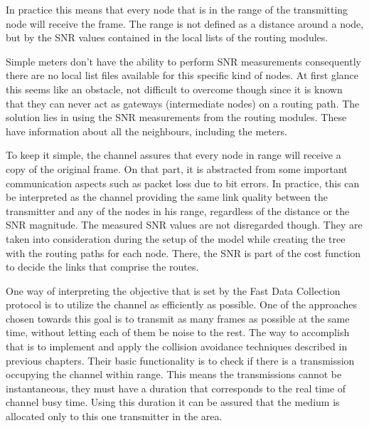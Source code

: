 In practice this means that every node that is in the range of the transmitting node will receive the frame. The range is not defined as a distance around a node, but by the SNR values contained in the local lists of the routing modules. 

Simple meters don't have the ability to perform SNR measurements consequently there are no local list files available for this specific kind of nodes. At first glance this seems like an obstacle, not difficult to overcome though since it is known that they can never act as gateways (intermediate nodes) on a routing path. The solution lies in using the SNR measurements from the routing modules. These have information about all the neighbours, including the meters.

To keep it simple, the channel assures that every node in range will receive a copy of the original frame. On that part, it is abstracted from some important communication aspects such as packet loss due to bit errors. In practice, this can be interpreted as the channel providing the same link quality between the transmitter and any of the nodes in his range, regardless of the distance or the SNR magnitude. The measured SNR values are not disregarded though. They are taken into consideration during the setup of the model while creating  the tree with the routing paths for each node. There, the SNR is part of the cost function to decide the links that comprise the routes.

One way of interpreting the objective that is set by the Fast Data Collection protocol is to utilize the channel as efficiently as possible. One of the approaches chosen towards this goal is to transmit as many frames as possible at the same time, without letting each of them be noise to the rest. The way to accomplish that is to implement and apply the collision avoidance techniques described in previous chapters. Their basic functionality is to check if there is a transmission occupying the channel within range. This means the transmissions cannot be instantaneous, they must have a duration that corresponds to the real time of channel busy time. Using this duration it can be assured that the medium  is allocated only to this one transmitter in the area.

